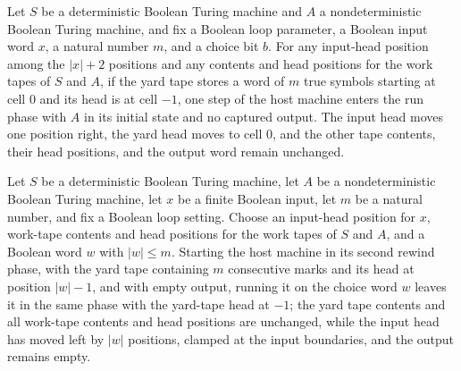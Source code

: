 \begin{theorem}
\label{Turing.ClockHost.rew2_turn}
\leanok
{}
Let $S$ be a deterministic Boolean Turing machine and $A$ a nondeterministic Boolean
Turing machine, and fix a Boolean loop parameter, a Boolean input word $x$, a natural
number $m$, and a choice bit $b$. For any input-head position among the $|x|+2$
positions and any contents and head positions for the work tapes of $S$ and $A$, if the
yard tape stores a word of $m$ true symbols starting at cell $0$ and its head is at cell
$-1$, one step of the host machine enters the run phase with $A$ in its initial state
and no captured output. The input head moves one position right, the yard head moves to
cell $0$, and the other tape contents, their head positions, and the output word remain
unchanged.
\end{theorem}

\begin{theorem}
\label{Turing.ClockHost.rew2_marks}
\leanok
{}
Let $S$ be a deterministic Boolean Turing machine, let $A$ be a nondeterministic Boolean
Turing machine, let $x$ be a finite Boolean input, let $m$ be a natural number, and fix
a Boolean loop setting. Choose an input-head position for $x$, work-tape contents and
head positions for the work tapes of $S$ and $A$, and a Boolean word $w$ with $|w| \le
m$. Starting the host machine in its second rewind phase, with the yard tape containing
$m$ consecutive marks and its head at position $|w|-1$, and with empty output, running
it on the choice word $w$ leaves it in the same phase with the yard-tape head at $-1$;
the yard tape contents and all work-tape contents and head positions are unchanged,
while the input head has moved left by $|w|$ positions, clamped at the input boundaries,
and the output remains empty.
\end{theorem}

